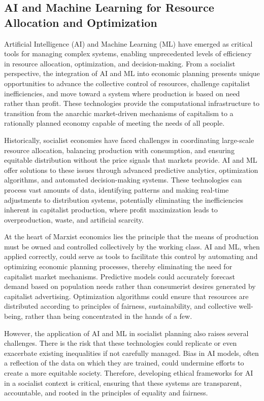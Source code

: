 \begin{refsection}
\section{AI and Machine Learning for Resource Allocation and Optimization}

Artificial Intelligence (AI) and Machine Learning (ML) have emerged as critical tools for managing complex systems, enabling unprecedented levels of efficiency in resource allocation, optimization, and decision-making. From a socialist perspective, the integration of AI and ML into economic planning presents unique opportunities to advance the collective control of resources, challenge capitalist inefficiencies, and move toward a system where production is based on need rather than profit. These technologies provide the computational infrastructure to transition from the anarchic market-driven mechanisms of capitalism to a rationally planned economy capable of meeting the needs of all people.

Historically, socialist economies have faced challenges in coordinating large-scale resource allocation, balancing production with consumption, and ensuring equitable distribution without the price signals that markets provide. AI and ML offer solutions to these issues through advanced predictive analytics, optimization algorithms, and automated decision-making systems. These technologies can process vast amounts of data, identifying patterns and making real-time adjustments to distribution systems, potentially eliminating the inefficiencies inherent in capitalist production, where profit maximization leads to overproduction, waste, and artificial scarcity.

At the heart of Marxist economics lies the principle that the means of production must be owned and controlled collectively by the working class. AI and ML, when applied correctly, could serve as tools to facilitate this control by automating and optimizing economic planning processes, thereby eliminating the need for capitalist market mechanisms. Predictive models could accurately forecast demand based on population needs rather than consumerist desires generated by capitalist advertising. Optimization algorithms could ensure that resources are distributed according to principles of fairness, sustainability, and collective well-being, rather than being concentrated in the hands of a few.

However, the application of AI and ML in socialist planning also raises several challenges. There is the risk that these technologies could replicate or even exacerbate existing inequalities if not carefully managed. Bias in AI models, often a reflection of the data on which they are trained, could undermine efforts to create a more equitable society. Therefore, developing ethical frameworks for AI in a socialist context is critical, ensuring that these systems are transparent, accountable, and rooted in the principles of equality and fairness.


\end{refsection}
